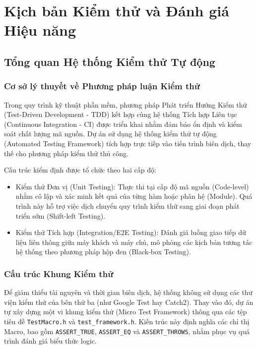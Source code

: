 \section{Kịch bản Kiểm thử và Đánh giá Hiệu năng}

\subsection{Tổng quan Hệ thống Kiểm thử Tự động}

\subsubsection{Cơ sở lý thuyết về Phương pháp luận Kiểm thử}

Trong quy trình kỹ thuật phần mềm, phương pháp Phát triển Hướng Kiểm thử (Test-Driven Development - TDD) kết hợp cùng hệ thống Tích hợp Liên tục (Continuous Integration - CI) được triển khai nhằm đảm bảo ổn định và kiểm soát chất lượng mã nguồn. Dự án sử dụng hệ thống kiểm thử tự động (Automated Testing Framework) tích hợp trực tiếp vào tiến trình biên dịch, thay thế cho phương pháp kiểm thử thủ công.

Cấu trúc kiểm định được tổ chức theo hai cấp độ:
\begin{itemize}[label={-}]
    \item Kiểm thử Đơn vị (Unit Testing): Thực thi tại cấp độ mã nguồn (Code-level) nhằm cô lập và xác minh kết quả của từng hàm hoặc phân hệ (Module). Quá trình này hỗ trợ việc dịch chuyển quy trình kiểm thử sang giai đoạn phát triển sớm (Shift-left Testing).
    \item Kiểm thử Tích hợp (Integration/E2E Testing): Đánh giá luồng giao tiếp dữ liệu liên thông giữa máy khách và máy chủ, mô phỏng các kịch bản tương tác hệ thống theo phương pháp hộp đen (Black-box Testing).
\end{itemize}

\subsubsection{Cấu trúc Khung Kiểm thử}

Để giảm thiểu tài nguyên và thời gian biên dịch, hệ thống không sử dụng các thư viện kiểm thử của bên thứ ba (như Google Test hay Catch2). Thay vào đó, dự án tự xây dựng một vi khung kiểm thử (Micro Test Framework) thông qua các tệp tiêu đề \texttt{TestMacro.h} và \texttt{test\_framework.h}. Kiến trúc này định nghĩa các chỉ thị Macro, bao gồm \texttt{ASSERT\_TRUE}, \texttt{ASSERT\_EQ} và \texttt{ASSERT\_THROWS}, nhằm phục vụ quá trình đánh giá biểu thức logic.

